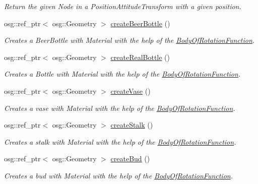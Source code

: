 \begin{DoxyCompactItemize}
\begin{DoxyCompactList}\small\item\em Return the given Node in a Position\+Attitude\+Transform with a given position. \end{DoxyCompactList}\item 
osg\+::ref\+\_\+ptr$<$ osg\+::\+Geometry $>$ \hyperlink{namespacebrtr_a16fa8982307a039c08ab56912bab94b9}{create\+Beer\+Bottle} ()
\begin{DoxyCompactList}\small\item\em Creates a Beer\+Bottle with Material with the help of the \hyperlink{structbrtr_1_1_body_of_rotation_function}{Body\+Of\+Rotation\+Function}. \end{DoxyCompactList}\item 
osg\+::ref\+\_\+ptr$<$ osg\+::\+Geometry $>$ \hyperlink{namespacebrtr_a614d8d6b8bcc6c4e7f7ffb24ca48eb4c}{create\+Real\+Bottle} ()
\begin{DoxyCompactList}\small\item\em Creates a Bottle with Material with the help of the \hyperlink{structbrtr_1_1_body_of_rotation_function}{Body\+Of\+Rotation\+Function}. \end{DoxyCompactList}\item 
osg\+::ref\+\_\+ptr$<$ osg\+::\+Geometry $>$ \hyperlink{namespacebrtr_ab4f3c063f7a8fa6cc33a8cb52b036d27}{create\+Vase} ()
\begin{DoxyCompactList}\small\item\em Creates a vase with Material with the help of the \hyperlink{structbrtr_1_1_body_of_rotation_function}{Body\+Of\+Rotation\+Function}. \end{DoxyCompactList}\item 
osg\+::ref\+\_\+ptr$<$ osg\+::\+Geometry $>$ \hyperlink{namespacebrtr_a4ccd9746e37278e47832da270dc00fb3}{create\+Stalk} ()
\begin{DoxyCompactList}\small\item\em Creates a stalk with Material with the help of the \hyperlink{structbrtr_1_1_body_of_rotation_function}{Body\+Of\+Rotation\+Function}. \end{DoxyCompactList}\item 
osg\+::ref\+\_\+ptr$<$ osg\+::\+Geometry $>$ \hyperlink{namespacebrtr_a51b3741c30ca1b6282b9693055ddc060}{create\+Bud} ()
\begin{DoxyCompactList}\small\item\em Creates a bud with Material with the help of the \hyperlink{structbrtr_1_1_body_of_rotation_function}{Body\+Of\+Rotation\+Function}. \end{DoxyCompactList}\item 

\end{DoxyCompactItemize}
